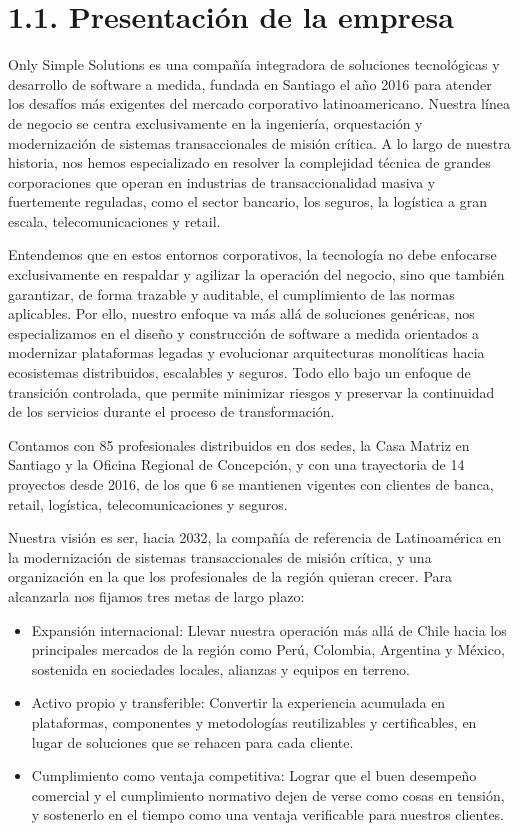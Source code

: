 \documentclass[11pt]{article}
\providecommand{\tightlist}{%
  \setlength{\itemsep}{0pt}\setlength{\parskip}{0pt}}
\begin{document}
\section{1.1. Presentación de la empresa}\label{presentaciuxf3n-de-la-empresa}

Only Simple Solutions es una compañía integradora de soluciones tecnológicas y desarrollo de software a medida, fundada en Santiago el año 2016 para atender los desafíos más exigentes del mercado corporativo latinoamericano. Nuestra línea de negocio se centra exclusivamente en la ingeniería, orquestación y modernización de sistemas transaccionales de misión crítica. A lo largo de nuestra historia, nos hemos especializado en resolver la complejidad técnica de grandes corporaciones que operan en industrias de transaccionalidad masiva y fuertemente reguladas, como el sector bancario, los seguros, la logística a gran escala, telecomunicaciones y retail.

Entendemos que en estos entornos corporativos, la tecnología no debe enfocarse exclusivamente en respaldar y agilizar la operación del negocio, sino que también garantizar, de forma trazable y auditable, el cumplimiento de las normas aplicables. Por ello, nuestro enfoque va más allá de soluciones genéricas, nos especializamos en el diseño y construcción de software a medida orientados a modernizar plataformas legadas y evolucionar arquitecturas monolíticas hacia ecosistemas distribuidos, escalables y seguros. Todo ello bajo un enfoque de transición controlada, que permite minimizar riesgos y preservar la continuidad de los servicios durante el proceso de transformación.

Contamos con 85 profesionales distribuidos en dos sedes, la Casa Matriz en Santiago y la Oficina Regional de Concepción, y con una trayectoria de 14 proyectos desde 2016, de los que 6 se mantienen vigentes con clientes de banca, retail, logística, telecomunicaciones y seguros.

Nuestra visión es ser, hacia 2032, la compañía de referencia de Latinoamérica en la modernización de sistemas transaccionales de misión crítica, y una organización en la que los profesionales de la región quieran crecer. Para alcanzarla nos fijamos tres metas de largo plazo:

\begin{itemize}
\tightlist
\item
  Expansión internacional: Llevar nuestra operación más allá de Chile hacia los principales mercados de la región como Perú, Colombia, Argentina y México, sostenida en sociedades locales, alianzas y equipos en terreno.
\item
  Activo propio y transferible: Convertir la experiencia acumulada en plataformas, componentes y metodologías reutilizables y certificables, en lugar de soluciones que se rehacen para cada cliente.
\item
  Cumplimiento como ventaja competitiva: Lograr que el buen desempeño comercial y el cumplimiento normativo dejen de verse como cosas en tensión, y sostenerlo en el tiempo como una ventaja verificable para nuestros clientes.
\end{itemize}
\end{document}
